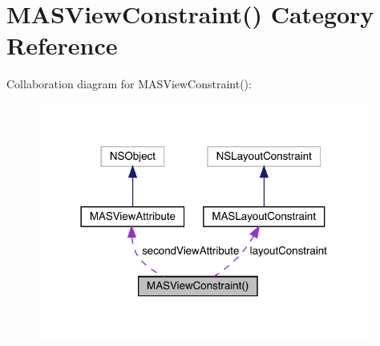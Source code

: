 \hypertarget{category_m_a_s_view_constraint_07_08}{}\section{M\+A\+S\+View\+Constraint() Category Reference}
\label{category_m_a_s_view_constraint_07_08}


Collaboration diagram for M\+A\+S\+View\+Constraint()\+:\nopagebreak
\begin{figure}[H]
\begin{center}
\leavevmode
\includegraphics[width=310pt]{category_m_a_s_view_constraint_07_08__coll__graph}
\end{center}
\end{figure}
